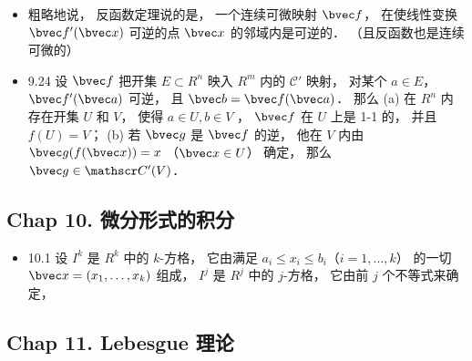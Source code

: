 \begin{itemize}
\item 粗略地说， 反函数定理说的是， 一个连续可微映射 $\bvec f$， 在使线性变换 $\bvec f'(\bvec x)$ 可逆的点 $\bvec x$ 的邻域内是可逆的． （且反函数也是连续可微的）

\item 9.24 设 $\bvec f$ 把开集 $E\subset R^n$ 映入 $R^m$ 内的 $\mathscr C'$ 映射， 对某个 $a\in E$， $\bvec f'(\bvec a)$ 可逆， 且 $\bvec b = \bvec f(\bvec a)$． 那么 (a) 在 $R^n$ 内存在开集 $U$ 和 $V$， 使得 $a\in U, b\in V$ ， $\bvec f$ 在 $U$ 上是 1-1 的， 并且 $f(U) = V$； (b) 若 $\bvec g$ 是 $\bvec f$ 的逆， 他在 $V$ 内由 $\bvec g(f(\bvec x)) = x$ （$\bvec x\in U$） 确定， 那么 $\bvec g\in \mathscr C'(V)$．
\end{itemize}

\subsection{Chap 10. 微分形式的积分}

\begin{itemize}
\item 10.1 设 $I^k$ 是 $R^k$ 中的 $k$-方格， 它由满足 $a_i\leqslant x_i \leqslant b_i$（$i=1,\dots,k$） 的一切 $\bvec x=(x_1,\dots,x_k)$ 组成， $I^j$ 是 $R^j$ 中的 $j$-方格， 它由前 $j$ 个不等式来确定， 
\end{itemize}


\subsection{Chap 11. Lebesgue 理论}
